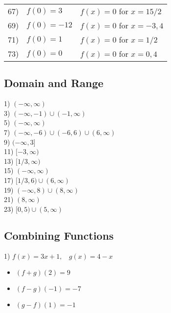 \documentclass[11pt]{book}
\theoremstyle{definition}  %
\newcounter{HW}
\begin{document}
\begin{tabular}{cll}
67) & $f(0)=3$ & $f(x)=0$ for $x=15/2$\\
69) & $f(0)=-12$ & $f(x)=0$ for $x=-3,4$\\
71) & $f(0)=1$ & $f(x)=0$ for $x=1/2$\\
73) & $f(0)=0$ & $f(x)=0$ for $x=0,4$
\end{tabular}
\newpage
\subsection*{Domain and Range}



\begin{multicols}{2}
1) $(-\infty,\infty)$\\
3) $(-\infty,-1)\cup(-1,\infty)$\\
5) $(-\infty,\infty)$\\
7) $(-\infty,-6)\cup(-6,6)\cup(6,\infty)$\\
9) $(-\infty,3]$\\
11) $[-3,\infty)$\\
13) $[1/3,\infty)$\\
15) $(-\infty,\infty)$\\
17) $[1/3,6)\cup(6,\infty)$\\
19) $(-\infty,8)\cup(8,\infty)$\\
21) $(8,\infty)$\\
23) $[0,5)\cup(5,\infty)$
\end{multicols}

\newpage
\subsection*{Combining Functions}

1) $f(x)=3x+1,~~~~g(x)=4-x$ 
\scriptsize
\begin{multicols}{3}
\begin{itemize}
\item  $(f+g)(2)=9$
\item  $(f-g)(-1)=-7$
\item  $(g-f)(1)=-1$
\end{itemize}
\end{multicols}
\end{document}
